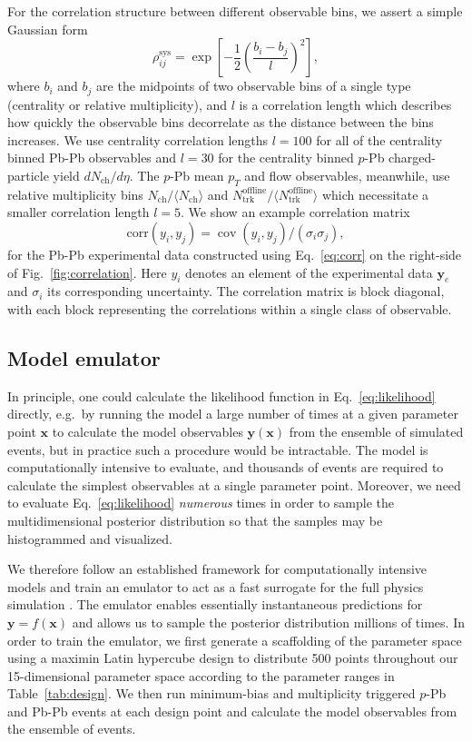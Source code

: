 \documentclass[aps,prc,reprint,amsmath,nofootinbib]{revtex4-1}
\newcommand{\nch}{N_\text{ch}}
\newcommand{\ntrk}{N_\text{trk}^\text{offline}}
\newcommand{\xv}{\mathbf x}
\newcommand{\yv}{\mathbf y}
\DeclareMathOperator{\cov}{cov}
\begin{document}
For the correlation structure between different observable bins, we assert a simple Gaussian form
\begin{equation}
  \label{eq:corr}
  \rho_{ij}^\text{sys} = \exp \left[ -\frac{1}{2} \left(\frac{b_i - b_j}{l} \right)^2 \right],
\end{equation}
where $b_i$ and $b_j$ are the midpoints of two observable bins of a single type (centrality or relative multiplicity), and $l$ is a correlation length which describes how quickly the observable bins decorrelate as the distance between the bins increases.
We use centrality correlation lengths $l=100$ for all of the centrality binned Pb-Pb observables and $l=30$ for the centrality binned $p$-Pb charged-particle yield $d\nch/d\eta$.
The \mbox{$p$-Pb} mean $p_T$ and flow observables, meanwhile, use relative multiplicity bins $\nch / \langle \nch \rangle$ and $\ntrk / \langle \ntrk \rangle$ which necessitate a smaller correlation length $l=5$.
We show an example correlation matrix
\begin{equation}
  \mathrm{corr}(y_i, y_j) = \cov(y_i, y_j)/(\sigma_i \sigma_j),
\end{equation}
for the Pb-Pb experimental data constructed using Eq.~\eqref{eq:corr} on the right-side of Fig.~\ref{fig:correlation}.
Here $y_i$ denotes an element of the experimental data $\yv_e$ and $\sigma_i$ its corresponding uncertainty.
The correlation matrix is block diagonal, with each block representing the correlations within a single class of observable.

\subsection{Model emulator}

In principle, one could calculate the likelihood function in Eq.~\eqref{eq:likelihood} directly, e.g.\ by running the model a large number of times at a given parameter point $\xv$ to calculate the model observables $\yv(\xv)$ from the ensemble of simulated events, but in practice such a procedure would be intractable.
The model is computationally intensive to evaluate, and thousands of events are required to calculate the simplest observables at a single parameter point.
Moreover, we need to evaluate Eq.~\eqref{eq:likelihood} \emph{numerous} times in order to sample the multidimensional posterior distribution so that the samples may be histogrammed and visualized.

We therefore follow an established framework for computationally intensive models and train an emulator to act as a fast surrogate for the full physics simulation \cite{OHagan:2006ba, Higdon:2008cmc, Higdon:2014tva}.
The emulator enables essentially instantaneous predictions for $\yv = f(\xv)$ and allows us to sample the posterior distribution millions of times.
In order to train the emulator, we first generate a scaffolding of the parameter space using a maximin Latin hypercube design \cite{Morris:1995lh} to distribute 500 points throughout our 15-dimensional parameter space according to the parameter ranges in Table~\ref{tab:design}.
We then run minimum-bias and multiplicity triggered $p$-Pb and Pb-Pb events at each design point and calculate the model observables from the ensemble of events.
\end{document}
